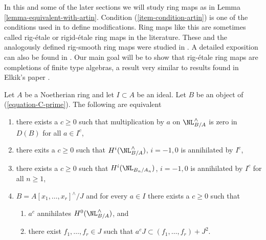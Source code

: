 \noindent
In this and some of the later sections we will study ring maps as
in Lemma \ref{lemma-equivalent-with-artin}. Condition
(\ref{item-condition-artin}) is one of the conditions used in
\cite{ArtinII} to define modifications. Ring maps like this are sometimes
called rig-\'etale or rigid-\'etale ring maps in the literature. These and
the analogously defined rig-smooth ring maps were studied
in \cite{Elkik}. A detailed exposition can also be found in
\cite{Abbes}. Our main goal will be to show that rig-\'etale
ring maps are completions of finite type algebras, a result
very similar to results found in Elkik's paper \cite{Elkik}.

\begin{lemma}
\label{lemma-equivalent-with-artin}
Let $A$ be a Noetherian ring and let $I \subset A$ be an ideal.
Let $B$ be an object of (\ref{equation-C-prime}). The following are equivalent
\begin{enumerate}
\item
\label{item-zero-on-NL}
there exists a $c \geq 0$ such that multiplication by $a$
on $\NL_{B/A}^\wedge$ is zero in $D(B)$ for all $a \in I^c$,
\item
\label{item-zero-on-cohomology-NL}
there exits a $c \geq 0$ such that $H^i(\NL_{B/A}^\wedge)$, $i = -1, 0$ is
annihilated by $I^c$,
\item
\label{item-zero-on-cohomology-NL-truncations}
there exists a $c \geq 0$ such that $H^i(\NL_{B_n/A_n})$, $i = -1, 0$ is
annihilated by $I^c$ for all $n \geq 1$,
\item
\label{item-condition-artin}
$B = A[x_1, \ldots, x_r]^\wedge/J$ and
for every $a \in I$ there exists a $c \geq 0$ such that
\begin{enumerate}
\item $a^c$ annihilates $H^0(\NL_{B/A}^\wedge)$, and
\item there exist $f_1, \ldots, f_r \in J$ such that
$a^c J \subset (f_1, \ldots, f_r) + J^2$.
\end{enumerate}
\end{enumerate}
\end{lemma}

